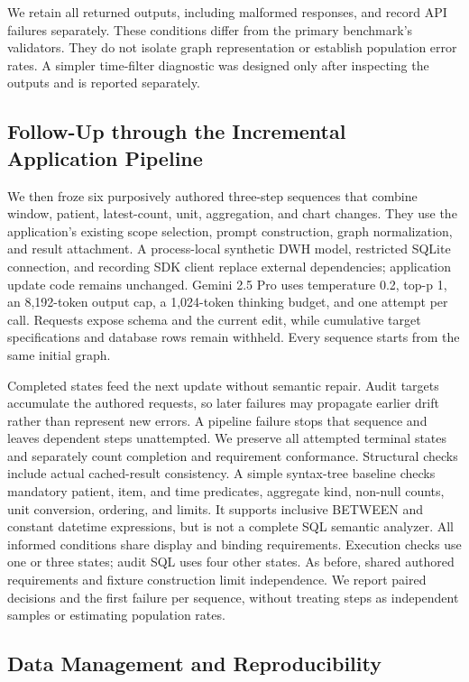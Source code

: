 \documentclass[manuscript,review,anonymous]{acmart}
\begin{document}
We retain all returned outputs, including malformed responses, and record API failures separately. These conditions differ from the primary benchmark's validators. They do not isolate graph representation or establish population error rates. A simpler time-filter diagnostic was designed only after inspecting the outputs and is reported separately.

\subsection{Follow-Up through the Incremental Application Pipeline}
\label{sec:sequential-pilot}

We then froze six purposively authored three-step sequences that combine window, patient, latest-count, unit, aggregation, and chart changes. They use the application's existing scope selection, prompt construction, graph normalization, and result attachment. A process-local synthetic DWH model, restricted SQLite connection, and recording SDK client replace external dependencies; application update code remains unchanged. Gemini 2.5 Pro uses temperature 0.2, top-p 1, an 8,192-token output cap, a 1,024-token thinking budget, and one attempt per call. Requests expose schema and the current edit, while cumulative target specifications and database rows remain withheld. Every sequence starts from the same initial graph.

Completed states feed the next update without semantic repair. Audit targets accumulate the authored requests, so later failures may propagate earlier drift rather than represent new errors. A pipeline failure stops that sequence and leaves dependent steps unattempted. We preserve all attempted terminal states and separately count completion and requirement conformance. Structural checks include actual cached-result consistency. A simple syntax-tree baseline checks mandatory patient, item, and time predicates, aggregate kind, non-null counts, unit conversion, ordering, and limits. It supports inclusive BETWEEN and constant datetime expressions, but is not a complete SQL semantic analyzer. All informed conditions share display and binding requirements. Execution checks use one or three states; audit SQL uses four other states. As before, shared authored requirements and fixture construction limit independence. We report paired decisions and the first failure per sequence, without treating steps as independent samples or estimating population rates.

\subsection{Data Management and Reproducibility}
\end{document}
